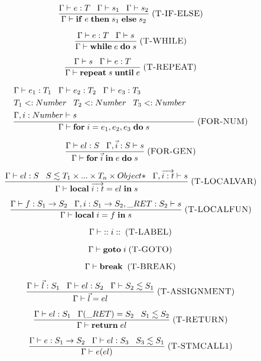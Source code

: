 \documentclass[12pt]{article}
\newcommand{\mylabel}[1]{\; (\textsc{#1})}
\newcommand{\subtype}{<:}
\newcommand{\kw}[1]{\mathbf{#1} \;}
\newcommand{\env}{\Gamma}
\newcommand{\ret}{\string_RET}
\begin{document}
\[
\frac{\env \vdash e:T \;\;\;
      \env \vdash s_{1} \;\;\;
      \env \vdash s_{2}}
     {\env \vdash \kw{if} e \; \kw{then} s_{1} \; \kw{else} s_{2}}
\mylabel{T-IF-ELSE}
\]

\[
\frac{\env \vdash e:T \;\;\;
      \env \vdash s}
     {\env \vdash \kw{while} e \; \kw{do} s}
\mylabel{T-WHILE}
\]

\[
\frac{\env \vdash s \;\;\;
      \env \vdash e:T}
     {\env \vdash \kw{repeat} s \; \kw{until} e}
\mylabel{T-REPEAT}
\]

\[
\frac{\begin{aligned}
      & \env \vdash e_{1}:T_{1} \;\;\;
        \env \vdash e_{2}:T_{2} \;\;\;
        \env \vdash e_{3}:T_{3} &\\
      & T_{1} \subtype Number \;\;\;
        T_{2} \subtype Number \;\;\;
        T_{3} \subtype Number &\\
      & \env, i:Number \vdash s &
      \end{aligned}}
     {\env \vdash \kw{for} i=e_{1},e_{2},e_{3} \; \kw{do} s}
\mylabel{FOR-NUM}
\]

\[
\frac{\env \vdash el:S \;\;\;
      \env, \vec{i}:S \vdash s}
     {\env \vdash \kw{for} \vec{i} \; \kw{in} e \; \kw{do} s}
\mylabel{FOR-GEN}
\]

\[
\frac{\env \vdash el:S \;\;\;
      S \lesssim T_{1} \times ... \times T_{n} \times {Object*} \;\;\;
      \env, \overrightarrow{i:t} \vdash s}
     {\env \vdash \kw{local} \overrightarrow{i:t} = el \; \kw{in} s}
\mylabel{T-LOCALVAR}
\]

\[
\frac{\env \vdash f:S_{1} \rightarrow S_{2} \;\;\;
      \env, i:S_{1} \rightarrow S_{2}, \ret:S_{2} \vdash s}
     {\env \vdash \kw{local} i = f \; \kw{in} s}
\mylabel{T-LOCALFUN}
\]

\[
\env \vdash \kw{::} i \; \kw{::}
\mylabel{T-LABEL}
\]

\[
\env \vdash \kw{goto} i
\mylabel{T-GOTO}
\]

\[
\env \vdash \kw{break}
\mylabel{T-BREAK}
\]

\[
\frac{\env \vdash \vec{l}:S_{1} \;\;\;
      \env \vdash el:S_{2} \;\;\;
      \env \vdash S_{2} \lesssim S_{1}}
     {\env \vdash \vec{l} = el}
\mylabel{T-ASSIGNMENT}
\]

\[
\frac{\env \vdash el:S_{1} \;\;\;
      \env(\ret) = S_{2} \;\;\;
      S_{1} \lesssim S_{2}}
     {\env \vdash \kw{return} el}
\mylabel{T-RETURN}
\]

\[
\frac{\env \vdash e:S_{1} \rightarrow S_{2} \;\;\;
      \env \vdash el:S_{3} \;\;\;
      S_{3} \lesssim S_{1}}
     {\env \vdash e(el)}
\mylabel{T-STMCALL1}
\]
\end{document}
